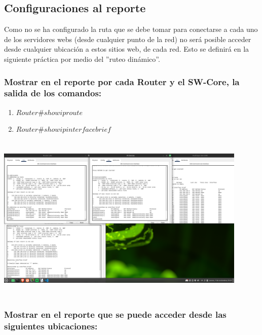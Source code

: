\documentclass[14pt]{book}
\begin{document}
{\color{red} \subsection*{\textbf{ Configuraciones al reporte}}}
\vspace{1em}

Como no se ha configurado la ruta que se debe tomar para conectarse a cada uno de los
servidores webs (desde cualquier punto de la red) no será posible acceder desde cualquier
ubicación a estos sitios web, de cada red. Esto se definirá en la siguiente práctica por medio
del ”ruteo dinámico”.\\

{\color{red} \subsubsection*{\textbf{  Mostrar en el reporte por cada Router y el SW-Core, la salida de los comandos:}}}
\vspace{1em}

\begin{enumerate}
  \item $Router\#show ip route$
  \item $Router\#show ip interface brief$
\end{enumerate}


\includegraphics[width=12cm, height=8cm]{images/finaaaaal routers.png}\\

{\color{red} \subsubsection*{\textbf{Mostrar en el reporte que se puede acceder desde las siguientes ubicaciones:}}}
\vspace{1em}
\end{document}
